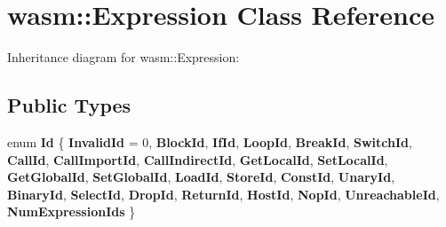 \hypertarget{classwasm_1_1_expression}{}\section{wasm\+:\+:Expression Class Reference}
\label{classwasm_1_1_expression}


Inheritance diagram for wasm\+:\+:Expression\+:
\subsection*{Public Types}
\begin{DoxyCompactItemize}
\item 
\mbox{\label{classwasm_1_1_expression_af7e9d0128179675c7a58e49955cedf72}} 
enum {\bfseries Id} \{ \newline
{\bfseries Invalid\+Id} = 0, 
{\bfseries Block\+Id}, 
{\bfseries If\+Id}, 
{\bfseries Loop\+Id}, 
\newline
{\bfseries Break\+Id}, 
{\bfseries Switch\+Id}, 
{\bfseries Call\+Id}, 
{\bfseries Call\+Import\+Id}, 
\newline
{\bfseries Call\+Indirect\+Id}, 
{\bfseries Get\+Local\+Id}, 
{\bfseries Set\+Local\+Id}, 
{\bfseries Get\+Global\+Id}, 
\newline
{\bfseries Set\+Global\+Id}, 
{\bfseries Load\+Id}, 
{\bfseries Store\+Id}, 
{\bfseries Const\+Id}, 
\newline
{\bfseries Unary\+Id}, 
{\bfseries Binary\+Id}, 
{\bfseries Select\+Id}, 
{\bfseries Drop\+Id}, 
\newline
{\bfseries Return\+Id}, 
{\bfseries Host\+Id}, 
{\bfseries Nop\+Id}, 
{\bfseries Unreachable\+Id}, 
\newline
{\bfseries Num\+Expression\+Ids}
 \}
\end{DoxyCompactItemize}
